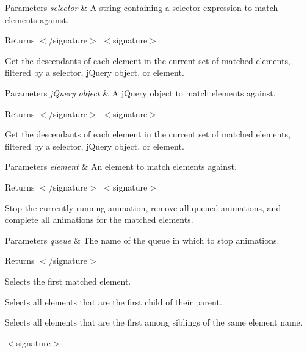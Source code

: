 \begin{DoxyParams}{Parameters}
{\em selector} & A string containing a selector expression to match elements against.\\
\hline
\end{DoxyParams}
\begin{DoxyReturn}{Returns}
$<$/signature$>$ $<$signature$>$ 

Get the descendants of each element in the current set of matched elements, filtered by a selector, j\-Query object, or element.
\end{DoxyReturn}

\begin{DoxyParams}{Parameters}
{\em j\-Query object} & A j\-Query object to match elements against.\\
\hline
\end{DoxyParams}
\begin{DoxyReturn}{Returns}
$<$/signature$>$ $<$signature$>$ 

Get the descendants of each element in the current set of matched elements, filtered by a selector, j\-Query object, or element.
\end{DoxyReturn}

\begin{DoxyParams}{Parameters}
{\em element} & An element to match elements against.\\
\hline
\end{DoxyParams}
\begin{DoxyReturn}{Returns}
$<$/signature$>$ $<$signature$>$ 

Stop the currently-\/running animation, remove all queued animations, and complete all animations for the matched elements.
\end{DoxyReturn}

\begin{DoxyParams}{Parameters}
{\em queue} & The name of the queue in which to stop animations.\\
\hline
\end{DoxyParams}
\begin{DoxyReturn}{Returns}
$<$/signature$>$ 

Selects the first matched element.
\end{DoxyReturn}


Selects all elements that are the first child of their parent.

Selects all elements that are the first among siblings of the same element name.

$<$signature$>$ 

